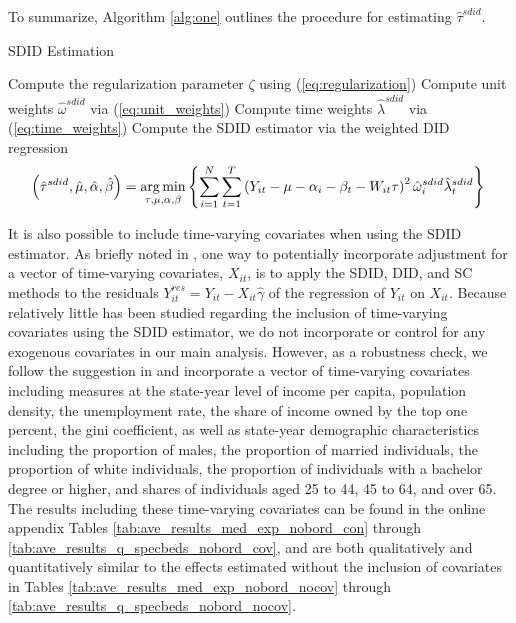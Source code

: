 \documentclass[../Main.tex]{subfiles}
\begin{document}
To summarize, Algorithm \ref{alg:one} outlines the procedure for estimating $\hat{\tau}^{sdid}$.
\vspace{.25cm}
\begin{center}
\begin{algorithm}[H]
\caption{SDID Estimation}\label{alg:one}
Compute the regularization parameter $\zeta$ using (\ref{eq:regularization})\;
Compute unit weights $\hat{\omega}^{sdid}$ via (\ref{eq:unit_weights})\;
Compute time weights $\hat{\lambda}^{sdid}$ via (\ref{eq:time_weights})\;
Compute the SDID estimator via the weighted DID regression
\begin{equation*}
    \left(\hat{\tau}^{sdid},\hat{\mu},\hat{\alpha},\hat{\beta}\right)=\operatorname*{arg\,min}_{\tau,\mu,\alpha,\beta}\left\{\sum_{i=1}^N\sum_{t=1}^T\left(Y_{it}-\mu-\alpha_i-\beta_t-W_{it}\tau\right)^2\hat{\omega}_i^{sdid}\hat{\lambda}_t^{sdid}\right\}\;
\end{equation*}
\end{algorithm}
\end{center}
$~$\\
\indent It is also possible to include time-varying covariates when using the SDID estimator. As briefly noted in \citet{arkhangelsky2021synthetic}, one way to potentially incorporate adjustment for a vector of time-varying covariates, $X_{it}$, is to apply the SDID, DID, and SC methods to the residuals $Y_{it}^{res}=Y_{it}-X_{it}\hat{\gamma}$ of the regression of $Y_{it}$ on $X_{it}$. Because relatively little has been studied regarding the inclusion of time-varying covariates using the SDID estimator, we do not incorporate or control for any exogenous covariates in our main analysis. However, as a robustness check, we follow the suggestion in \citet{arkhangelsky2021synthetic} and incorporate a vector of time-varying covariates including measures at the state-year level of income per capita, population density, the unemployment rate, the share of income owned by the top one percent, the gini coefficient, as well as state-year demographic characteristics including the proportion of males, the proportion of married individuals, the proportion of white individuals, the proportion of individuals with a bachelor degree or higher, and shares of individuals aged 25 to 44, 45 to 64, and over 65. The results including these time-varying covariates can be found in the online appendix Tables \ref{tab:ave_results_med_exp_nobord_con} through \ref{tab:ave_results_q_specbeds_nobord_cov}, and are both qualitatively and quantitatively similar to the effects estimated without the inclusion of covariates in Tables \ref{tab:ave_results_med_exp_nobord_nocov} through \ref{tab:ave_results_q_specbeds_nobord_nocov}.
\end{document}

